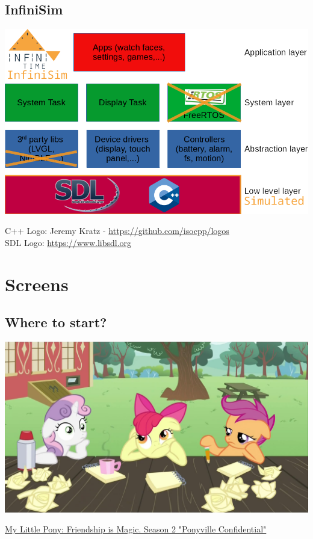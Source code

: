 \documentclass{beamer}
\begin{document}
\subsection{InfiniSim}
\begin{frame}{}
  \includegraphics[width=\textwidth]{../architecture_infinisim}

  \small C++ Logo: Jeremy Kratz -
    \href{https://github.com/isocpp/logos}{https://github.com/isocpp/logos}\\
  \small SDL Logo: \href{https://www.libsdl.org}{https://www.libsdl.org}
\end{frame}

\section{Screens}
\subsection{Where to start?}
\begin{frame}{}
  \includegraphics[width=\textwidth]{../ponies_thinking}

  \small \href{http://awthredestim.blogspot.com/2012/04/my-little.html}{My Little Pony: Friendship is Magic. Season 2 "Ponyville Confidential"}
\end{frame}
\end{document}
